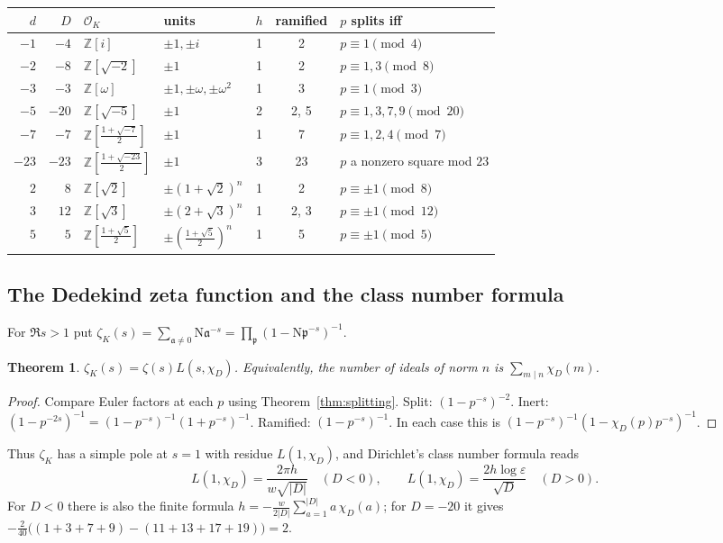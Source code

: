 \documentclass[11pt]{article}
\numberwithin{equation}{section}
\newcommand{\N}{\mathrm N}
\newcommand{\Z}{\mathbb Z}
\newcommand{\OK}{\mathcal O_K}
\newcommand{\p}{\mathfrak p}
\newtheorem{theorem}{Theorem}
\theoremstyle{definition}
\theoremstyle{remark}
\begin{document}
\begin{center}
\small
\begin{tabular}{@{}rrllccl@{}}
\toprule
$d$ & $D$ & $\OK$ & units & $h$ & ramified & $p$ splits iff\\\midrule
$-1$ & $-4$ & $\Z[i]$ & $\pm1,\pm i$ & 1 & 2 & $p\equiv1\pmod 4$\\
$-2$ & $-8$ & $\Z[\sqrt{-2}]$ & $\pm1$ & 1 & 2 & $p\equiv1,3\pmod 8$\\
$-3$ & $-3$ & $\Z[\omega]$ & $\pm1,\pm\omega,\pm\omega^2$ & 1 & 3 & $p\equiv1\pmod 3$\\
$-5$ & $-20$ & $\Z[\sqrt{-5}]$ & $\pm1$ & 2 & 2, 5 & $p\equiv1,3,7,9\pmod{20}$\\
$-7$ & $-7$ & $\Z[\frac{1+\sqrt{-7}}2]$ & $\pm1$ & 1 & 7 & $p\equiv1,2,4\pmod 7$\\
$-23$ & $-23$ & $\Z[\frac{1+\sqrt{-23}}2]$ & $\pm1$ & 3 & 23 & $p$ a nonzero square mod $23$\\
$2$ & $8$ & $\Z[\sqrt2]$ & $\pm(1+\sqrt2)^n$ & 1 & 2 & $p\equiv\pm1\pmod 8$\\
$3$ & $12$ & $\Z[\sqrt3]$ & $\pm(2+\sqrt3)^n$ & 1 & 2, 3 & $p\equiv\pm1\pmod{12}$\\
$5$ & $5$ & $\Z[\frac{1+\sqrt5}2]$ & $\pm(\frac{1+\sqrt5}2)^n$ & 1 & 5 & $p\equiv\pm1\pmod 5$\\
\bottomrule
\end{tabular}
\end{center}

\subsection{The Dedekind zeta function and the class number formula}
For $\Re s>1$ put $\zeta_K(s)=\sum_{\mathfrak a\ne0}\N\mathfrak a^{-s}=\prod_\p(1-\N\p^{-s})^{-1}$.

\begin{theorem}\label{thm:zetaK}
$\zeta_K(s)=\zeta(s)L(s,\chi_D)$. Equivalently, the number of ideals of norm $n$ is
$\sum_{m\mid n}\chi_D(m)$.
\end{theorem}

\begin{proof}
Compare Euler factors at each $p$ using Theorem~\ref{thm:splitting}. Split:
$(1-p^{-s})^{-2}$. Inert: $(1-p^{-2s})^{-1}=(1-p^{-s})^{-1}(1+p^{-s})^{-1}$. Ramified:
$(1-p^{-s})^{-1}$. In each case this is $(1-p^{-s})^{-1}(1-\chi_D(p)p^{-s})^{-1}$.
\end{proof}

Thus $\zeta_K$ has a simple pole at $s=1$ with residue $L(1,\chi_D)$, and Dirichlet's class
number formula \cite[Ch.~6]{Dav} reads
\begin{equation}\label{eq:cnf}
 L(1,\chi_D)=\frac{2\pi h}{w\sqrt{|D|}}\quad(D<0),\qquad
 L(1,\chi_D)=\frac{2h\log\varepsilon}{\sqrt D}\quad(D>0).
\end{equation}
For $D<0$ there is also the finite formula $h=-\frac{w}{2|D|}\sum_{a=1}^{|D|}a\,\chi_D(a)$;
for $D=-20$ it gives $-\frac{2}{40}\bigl((1+3+7+9)-(11+13+17+19)\bigr)=2$.
\end{document}
